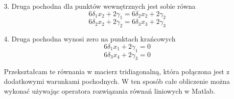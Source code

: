 \documentclass[varwidth,12pt,a4paper]{article}
\begin{document}
3. Druga pochodna dla punktów wewnętrznych jest sobie równa
\begin{equation}
    6\delta _1 x_2 + 2 \gamma _1 = 6 \delta _2 x_2 + 2 \gamma _2
\end{equation}
\begin{equation}
    6\delta _2 x_2 + 2 \gamma _2 = 6 \delta _3 x_3 + 2 \gamma _3
\end{equation}

4. Druga pochodna wynosi zero na punktach krańcowych
\begin{equation}
    6\delta _1 x_1 + 2 \gamma _1 = 0
\end{equation}
\begin{equation}
    6\delta _3 x_4 + 2 \gamma _3 = 0
\end{equation}

Przekształcam te równania w macierz tridiagonalną, która połączona jest z dodatkowymi warunkami pochodnych. 
W ten sposób całe obliczenie można wykonać używając operatora rozwiązania równań liniowych w Matlab.
\end{document}
